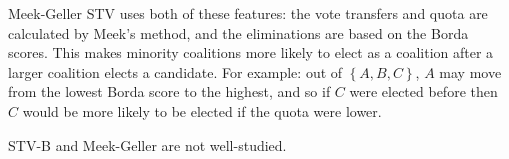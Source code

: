 Meek-Geller STV uses both of these features:  the vote transfers and quota are calculated by Meek's method, and the eliminations are based on the Borda scores.  This makes minority coalitions more likely to elect as a coalition after a larger coalition elects a candidate.  For example:  out of $\left\{A,B,C\right\}$, $A$ may move from the lowest Borda score to the highest, and so if $C$ were elected before then $C$ would be more likely to be elected if the quota were lower.

STV-B and Meek-Geller are not well-studied.

%
%
%
%
%
%
%
%
%
%
%
